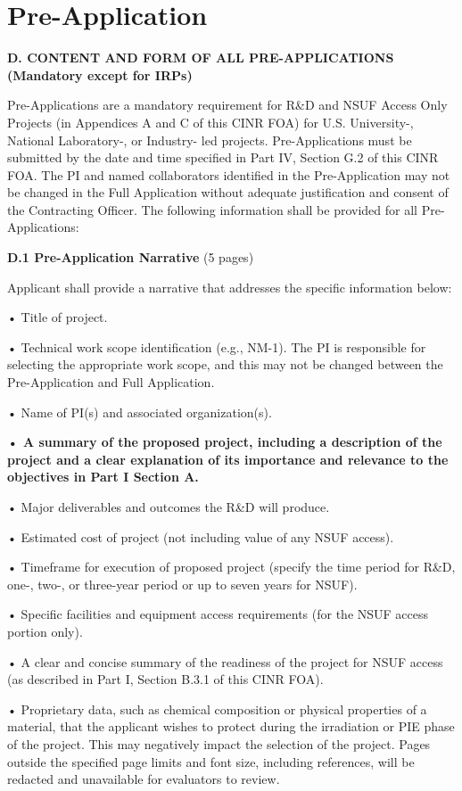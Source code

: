 \section{Pre-Application}


{\bf D. CONTENT AND FORM OF ALL PRE-APPLICATIONS (Mandatory except for IRPs)}

Pre-Applications are a mandatory requirement for R\&D and NSUF Access Only
Projects (in Appendices A and C of this CINR FOA) for U.S. University-,
National Laboratory-, or Industry- led projects. Pre-Applications must be
submitted by the date and time specified in Part IV, Section G.2 of this CINR
FOA.  The PI and named collaborators identified in the Pre-Application may not
be changed in the Full Application without adequate justification and consent
of the Contracting Officer.  The following information shall be provided for
all Pre-Applications:

{\bf D.1 Pre-Application Narrative} (5 pages)

Applicant shall provide a narrative that addresses the specific information below:

• Title of project.

• Technical work scope identification (e.g., NM-1). The PI is responsible for
selecting the appropriate work scope, and this may not be changed between the
Pre-Application and Full Application.

• Name of PI(s) and associated organization(s).

{\bf
• A summary of the proposed project, including a description of the project and
a clear explanation of its importance and relevance to the objectives in Part I
Section A.

• Major deliverables and outcomes the R\&D will produce.

• Estimated cost of project (not including value of any NSUF access).

• Timeframe for execution of proposed project (specify the time period for R\&D,
one-, two-, or three-year period or up to seven years for NSUF).
}

• Specific facilities and equipment access requirements (for the NSUF access portion only).

• A clear and concise summary of the readiness of the project for NSUF access
(as described in Part I, Section B.3.1 of this CINR FOA).

• Proprietary data, such as chemical composition or physical properties of a
material, that the applicant wishes to protect during the irradiation or PIE
phase of the project. This may negatively impact the selection of the project.
Pages outside the specified page limits and font size, including references,
will be redacted and unavailable for evaluators to review.

